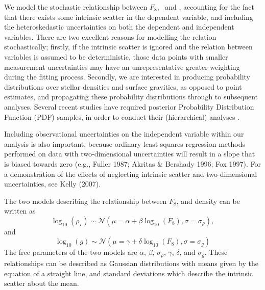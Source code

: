 We model the stochastic relationship between $F_8$, \logg\ and \rhostar,
accounting for the fact that there exists some intrinsic scatter in
the dependent variable, and including the heteroskedastic uncertainties on both
the dependent and independent variables.
There are two excellent reasons for modelling the relation stochastically;
firstly, if the intrinsic scatter is ignored and the relation between
variables is assumed to be deterministic, those data points with smaller
measurement uncertainties may have an unrepresentative greater weighting
during the fitting process.
Secondly, we are interested in producing probability distributions over stellar
densities and surface gravities, as opposed to point estimates, and propagating
these probability distributions through to subsequent analyses.
Several recent studies have required posterior Probability Distribution
Function (PDF) samples, in order to conduct their (hierarchical)
analyses \citep[e.g.][]{rogers:2015, foreman-mackey:2014, angus:2015}.

Including observational uncertainties on the independent variable within our
analysis is also important, because ordinary least squares regression methods
performed on data with two-dimensional uncertainties will result in a slope
that is biased towards zero
(e.g., Fuller 1987; Akritas \& Bershady 1996; Fox 1997).
For a demonstration of the effects of neglecting intrinsic scatter and
two-dimensional uncertainties, see Kelly (2007).

The two models describing the relationship between $F_8$, \logg and \rhostar
density can be written as
\begin{equation}
	\log_{10}(\rho_\star) \sim \mathcal{N}(\mu = \alpha + \beta
	\log_{10}(F_8), \sigma = \sigma_{\rho}),
\end{equation}
\label{eq:rho}
and
\begin{equation}
	\log_{10}(g) \sim \mathcal{N}(\mu = \gamma + \delta \log_{10}(F_8),
	\sigma = \sigma_g)
\end{equation}
\label{eq:logg}
The free parameters of the two models are $\alpha$, $\beta$, $\sigma_{\rho}$,
$\gamma$, $\delta$, and $\sigma_g$.
These relationships can be described as Gaussian distributions with means
given by the equation of a straight line, and standard deviations which
describe the intrinsic scatter about the mean.

